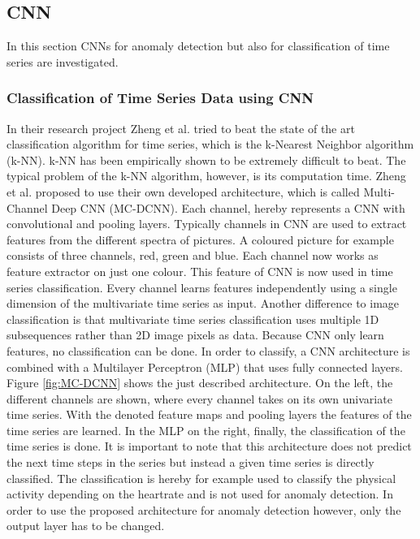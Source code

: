 \subsection{CNN}
In this section CNNs for anomaly detection but also for classification of time series are investigated. 

\subsubsection{Classification of Time Series Data using CNN}
In their research project Zheng et al. \parencite*{Zheng2014} tried to beat the state of the art classification algorithm for time series, which is the k-Nearest Neighbor algorithm (k-NN). k-NN has been empirically shown to be extremely difficult to beat. The typical problem of the k-NN algorithm, however, is its computation time. Zheng et al. proposed to use their own developed architecture, which is called Multi-Channel Deep CNN (MC-DCNN). Each channel, hereby represents a CNN with convolutional and pooling layers.
Typically channels in CNN are used to extract features from the different spectra of pictures. A coloured picture for example consists of three channels, red, green and blue. Each channel now works as feature extractor on just one colour.
This feature of CNN is now used in time series classification. Every channel learns features independently using a single dimension of the multivariate time series as input. Another difference to image classification is that multivariate time series classification uses multiple 1D subsequences rather than 2D image pixels as data. Because CNN only learn features, no classification can be done. In order to classify, a CNN architecture is combined with a Multilayer Perceptron (MLP) that uses fully connected layers. Figure \ref{fig:MC-DCNN} shows the just described architecture. On the left, the different channels are shown, where every channel takes on its own univariate time series. With the denoted feature maps and pooling layers the features of the time series are learned. In the MLP on the right, finally, the classification of the time series is done. 
It is important to note that this architecture does not predict the next time steps in the series but instead a given time series is directly classified. The classification is hereby for example used to classify the physical activity depending on the heartrate and is not used for anomaly detection. In order to use the proposed architecture for anomaly detection however, only the output layer has to be changed. 

